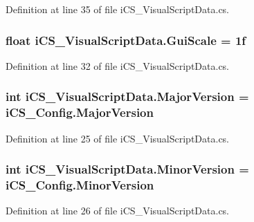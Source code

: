 Definition at line 35 of file i\+C\+S\+\_\+\+Visual\+Script\+Data.\+cs.

\hypertarget{classi_c_s___visual_script_data_a8ee236852552ec82eb8bc99ad009017d}{
\subsubsection[{Gui\+Scale}]{\setlength{\rightskip}{0pt plus 5cm}float i\+C\+S\+\_\+\+Visual\+Script\+Data.\+Gui\+Scale = 1f}}\label{classi_c_s___visual_script_data_a8ee236852552ec82eb8bc99ad009017d}


Definition at line 32 of file i\+C\+S\+\_\+\+Visual\+Script\+Data.\+cs.

\hypertarget{classi_c_s___visual_script_data_a0f5027231abdf8acfde9b7a817d63d9e}{
\subsubsection[{Major\+Version}]{\setlength{\rightskip}{0pt plus 5cm}int i\+C\+S\+\_\+\+Visual\+Script\+Data.\+Major\+Version = i\+C\+S\+\_\+\+Config.\+Major\+Version}}\label{classi_c_s___visual_script_data_a0f5027231abdf8acfde9b7a817d63d9e}


Definition at line 25 of file i\+C\+S\+\_\+\+Visual\+Script\+Data.\+cs.

\hypertarget{classi_c_s___visual_script_data_aed4c8e59293c7741798428d1347d6d9c}{
\subsubsection[{Minor\+Version}]{\setlength{\rightskip}{0pt plus 5cm}int i\+C\+S\+\_\+\+Visual\+Script\+Data.\+Minor\+Version = i\+C\+S\+\_\+\+Config.\+Minor\+Version}}\label{classi_c_s___visual_script_data_aed4c8e59293c7741798428d1347d6d9c}


Definition at line 26 of file i\+C\+S\+\_\+\+Visual\+Script\+Data.\+cs.

